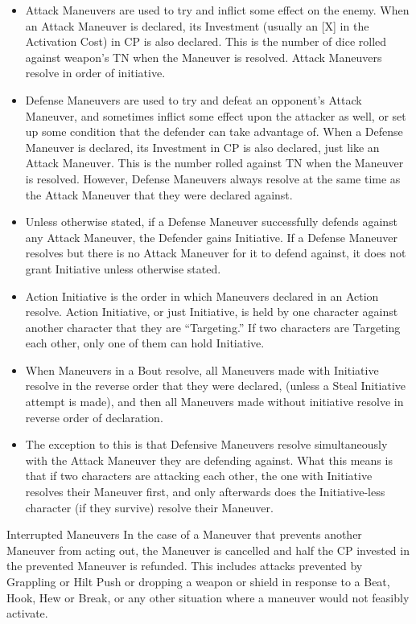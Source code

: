 \documentclass[oneside,11pt,english]{book}
\begin{document}
 
\begin{itemize}
\item Attack Maneuvers are used to try and inflict some effect on the enemy. When an Attack 
 Maneuver is declared, its Investment (usually an [X] in the Activation Cost) in CP is 
also declared. This is the number of dice rolled against weapon’s TN when the Maneuver is 
resolved. Attack Maneuvers resolve in order of initiative. 
\item Defense Maneuvers are used to try and defeat an opponent's Attack Maneuver, and 
 sometimes inflict some effect upon the attacker as well, or set up some condition that the 
defender can take advantage of. When a Defense Maneuver is declared, its Investment in CP is 
also declared, just like an Attack Maneuver. This is the number rolled against TN when the 
Maneuver is resolved. However, Defense Maneuvers always resolve at the same time as the 
Attack Maneuver that they were declared against. 
\item Unless otherwise stated, if a Defense Maneuver successfully defends against any Attack 
Maneuver, the Defender gains Initiative. If a Defense Maneuver resolves but there is no Attack 
Maneuver for it to defend against, it does not grant Initiative unless otherwise stated. 
\item Action Initiative is the order in which Maneuvers declared in an Action resolve. Action 
Initiative, or just Initiative, is held by one character against another character that they are 
“Targeting.” If two characters are Targeting each other, only one of them can hold 
 Initiative. 
\item When Maneuvers in a Bout resolve, all Maneuvers made with Initiative resolve in the reverse 
order that they were declared, (unless a Steal Initiative attempt is made), and then all Maneuvers 
made without initiative resolve in reverse order of declaration. 
\item The exception to this is that Defensive Maneuvers resolve simultaneously with the Attack 
 Maneuver they are defending against. What this means is that if two characters are 
attacking each other, the one with Initiative resolves their Maneuver first, and only afterwards 
does the Initiative-less character (if they survive) resolve their Maneuver. 
\end{itemize}
 

Interrupted Maneuvers 
In the case of a Maneuver that prevents another Maneuver from acting out, the Maneuver is cancelled and 
half the CP invested in the prevented Maneuver is refunded. This includes attacks prevented by Grappling 
or Hilt Push or dropping a weapon or shield in response to a Beat, Hook, Hew or Break, or any other 
situation where a maneuver would not feasibly activate. 
\end{document}
